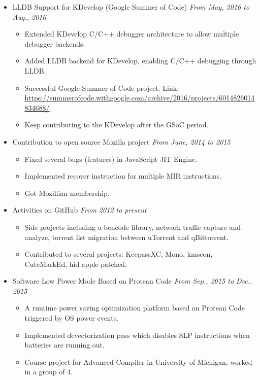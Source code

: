 \documentclass[letterpaper,11pt]{article}
\newenvironment{extra}{}{}
\begin{document}
\begin{itemize}
    \item LLDB Support for KDevelop (Google Summer of Code) \hfill \textit{From May, 2016 to Aug., 2016}
    \begin{itemize}
        \item Extended KDevelop C/C++ debugger architecture to allow multiple debugger backends.
        \item Added LLDB backend for KDevelop, enabling C/C++ debugging through LLDB.
        \item Successful Google Summer of Code project. Link:
\url{https://summerofcode.withgoogle.com/archive/2016/projects/6014826014834688/}
        \item Keep contributing to the KDevelop after the GSoC period.
    \end{itemize}

\begin{extra}
    \item Contribution to open source Mozilla project \hfill \textit{From June, 2014 to 2015}
    \begin{itemize}
        \item Fixed several bugs (features) in JavaScript JIT Engine.
        \item Implemented recover instruction for multiple MIR instructions.
        \item Got Mozillian membership.
    \end{itemize}
\end{extra}

\begin{extra}
    \item Activities on GitHub \hfill \textit{From 2012 to present}
    \begin{itemize}
        \item Side projects including a bencode library, network traffic capture and analyze, torrent list
migration between uTorrent and qBittorrent.
        \item Contributed to several projects: KeepassXC, Mono, kmscon, CuteMarkEd, hid-apple-patched.
    \end{itemize}
\end{extra}

    \item Software Low Power Mode Based on Protean Code \hfill \textit{From Sep., 2015 to Dec., 2015}
    \begin{itemize}
        \item A runtime power saving optimization platform based on Protean Code triggered by OS power events.
        \item Implemented devectorization pass which disables SLP instructions when batteries are running out.
        \item Course project for Advanced Compiler in University of Michigan, worked in a group of 4.
    \end{itemize}


\end{itemize}
\end{document}
